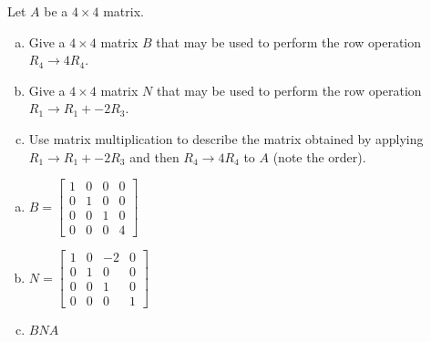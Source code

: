 
\begin{exerciseStatement}


Let \(A\) be a \(4 \times 4\) matrix.


\begin{enumerate}[(a)]
\item Give a \(4 \times 4\) matrix \(B\) that may be used to perform the row operation \( R_4 \to 4R_4 \).
\item Give a \(4 \times 4\) matrix \(N\) that may be used to perform the row operation \( R_1 \to R_1 + -2R_3 \).
\item Use matrix multiplication to describe the matrix obtained by applying \( R_1 \to R_1 + -2R_3 \) and then \( R_4 \to 4R_4 \) to \(A\) (note the order). 
\end{enumerate}
    
\end{exerciseStatement}
    
\begin{exerciseAnswer} 

\begin{enumerate}[(a)]
\item \(B= \left[\begin{array}{cccc}
1 & 0 & 0 & 0 \\
0 & 1 & 0 & 0 \\
0 & 0 & 1 & 0 \\
0 & 0 & 0 & 4
\end{array}\right] \)
\item \(N= \left[\begin{array}{cccc}
1 & 0 & -2 & 0 \\
0 & 1 & 0 & 0 \\
0 & 0 & 1 & 0 \\
0 & 0 & 0 & 1
\end{array}\right] \)
\item \(BNA\)
\end{enumerate}
    
\end{exerciseAnswer}
    
